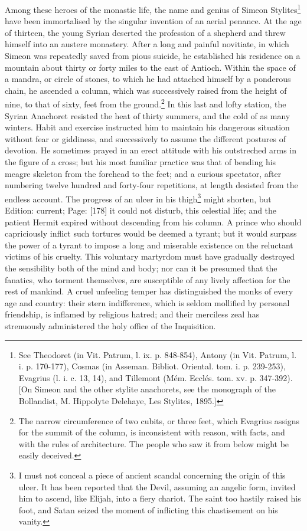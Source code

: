 Among these heroes of the monastic life, the name and genius of Simeon Stylites\footnote{See Theodoret (in Vit. Patrum, l. ix. p. 848-854), Antony (in Vit. Patrum, l. i. p. 170-177), Cosmas (in Asseman. Bibliot. Oriental. tom. i. p. 239-253), Evagrius (l. i. c. 13, 14), and Tillemont (Mém. Ecclés. tom. xv. p. 347-392). [On Simeon and the other stylite anachorets, see the monograph of the Bollandist, M. Hippolyte Delehaye, Les Stylites, 1895.]} have been immortalised by the singular invention of an aerial penance. At the age of thirteen, the young Syrian deserted the profession of a shepherd and threw himself into an austere monastery. After a long and painful novitiate, in which Simeon was repeatedly saved from pious suicide, he established his residence on a mountain about thirty or forty miles to the east of Antioch. Within the space of a mandra, or circle of stones, to which he had attached himself by a ponderous chain, he ascended a column, which was successively raised from the height of nine, to that of sixty, feet from the ground.\footnote{The narrow circumference of two cubits, or three feet, which Evagrius assigns for the summit of the column, is inconsistent with reason, with facts, and with the rules of architecture. The people who saw it from below might be easily deceived.} In this last and lofty station, the Syrian Anachoret resisted the heat of thirty summers, and the cold of as many winters. Habit and exercise instructed him to maintain his dangerous situation without fear or giddiness, and successively to assume the different postures of devotion. He sometimes prayed in an erect attitude with his outstreched arms in the figure of a cross; but his most familiar practice was that of bending his meagre skeleton from the forehead to the feet; and a curious spectator, after numbering twelve hundred and forty-four repetitions, at length desisted from the endless account. The progress of an ulcer in his thigh\footnote{I must not conceal a piece of ancient scandal concerning the origin of this ulcer. It has been reported that the Devil, assuming an angelic form, invited him to ascend, like Elijah, into a fiery chariot. The saint too hastily raised his foot, and Satan seized the moment of inflicting this chastisement on his vanity.} might shorten, but Edition: current; Page: [178] it could not disturb, this celestial life; and the patient Hermit expired without descending from his column. A prince who should capriciously inflict such tortures would be deemed a tyrant; but it would surpass the power of a tyrant to impose a long and miserable existence on the reluctant victims of his cruelty. This voluntary martyrdom must have gradually destroyed the sensibility both of the mind and body; nor can it be presumed that the fanatics, who torment themselves, are susceptible of any lively affection for the rest of mankind. A cruel unfeeling temper has distinguished the monks of every age and country: their stern indifference, which is seldom mollified by personal friendship, is inflamed by religious hatred; and their merciless zeal has strenuously administered the holy office of the Inquisition.

